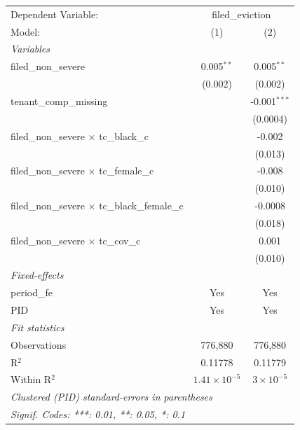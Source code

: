 \par\endgroup
\begingroup
\centering
\begin{tabular}{lcc}
   \tabularnewline \midrule \midrule
   Dependent Variable: & \multicolumn{2}{c}{filed\_eviction}\\
   Model:                                                 & (1)                   & (2)\\  
   \midrule
   \emph{Variables}\\
   filed\_non\_severe                                     & 0.005$^{**}$          & 0.005$^{**}$\\   
                                                          & (0.002)               & (0.002)\\   
   tenant\_comp\_missing                                  &                       & -0.001$^{***}$\\   
                                                          &                       & (0.0004)\\   
   filed\_non\_severe $\times$ tc\_black\_c               &                       & -0.002\\   
                                                          &                       & (0.013)\\   
   filed\_non\_severe $\times$ tc\_female\_c              &                       & -0.008\\   
                                                          &                       & (0.010)\\   
   filed\_non\_severe $\times$ tc\_black\_female\_c       &                       & -0.0008\\   
                                                          &                       & (0.018)\\   
   filed\_non\_severe $\times$ tc\_cov\_c                 &                       & 0.001\\   
                                                          &                       & (0.010)\\   
   \midrule
   \emph{Fixed-effects}\\
   period\_fe                                             & Yes                   & Yes\\  
   PID                                                    & Yes                   & Yes\\  
   \midrule
   \emph{Fit statistics}\\
   Observations                                           & 776,880               & 776,880\\  
   R$^2$                                                  & 0.11778               & 0.11779\\  
   Within R$^2$                                           & $1.41\times 10^{-5}$  & $3\times 10^{-5}$\\   
   \midrule \midrule
   \multicolumn{3}{l}{\emph{Clustered (PID) standard-errors in parentheses}}\\
   \multicolumn{3}{l}{\emph{Signif. Codes: ***: 0.01, **: 0.05, *: 0.1}}\\
\end{tabular}
\par\endgroup
